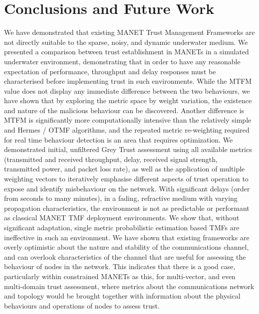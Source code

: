 \documentclass[conference]{IEEEtran}
\begin{document}
\section{Conclusions and Future Work}
We have demonstrated that existing MANET Trust Management Frameworks are not directly suitable to the sparse, noisy, and dynamic underwater medium.
We presented a comparison between trust establishment in MANETs in a simulated underwater environment, demonstrating that in order to have any reasonable expectation of performance, throughput and delay responses must be characterised before implementing trust in such environments. 
While the MTFM value does not display any immediate difference between the two behaviours, we have shown that by exploring the metric space by weight variation, the existence and nature of the malicious behaviour can be discovered.
Another difference is MTFM is significantly more computationally intensive than the relatively simple and Hermes / OTMF algorithms, and the repeated metric re-weighting required for real time behaviour detection is an area that requires optimization. 
We demonstrated initial, unfiltered Grey Trust assessment using all available metrics (transmitted and received throughput, delay, received signal strength, transmitted power, and packet loss rate), as well as the application of multiple weighting vectors to iteratively emphasise different aspects of trust operation to expose and identify misbehaviour on the network.
With significant delays (order from seconds to many minutes), in a fading, refractive medium with varying propagation characteristics, the environment is not as predictable or performant as classical MANET TMF deployment environments.
We show that, without significant adaptation, single metric probabilistic estimation based TMFs are ineffective in such an environment.
We have shown that existing frameworks are overly optimistic about the nature and stability of the communications channel, and can overlook characteristics of the channel that are useful for assessing the behaviour of nodes in the network. 
This indicates that there is a good case, particularly within constrained MANETs as this, for multi-vector, and even multi-domain trust assessment, where metrics about the communications network and topology would be brought together with information about the physical behaviours and operations of nodes to assess trust.
\end{document}
